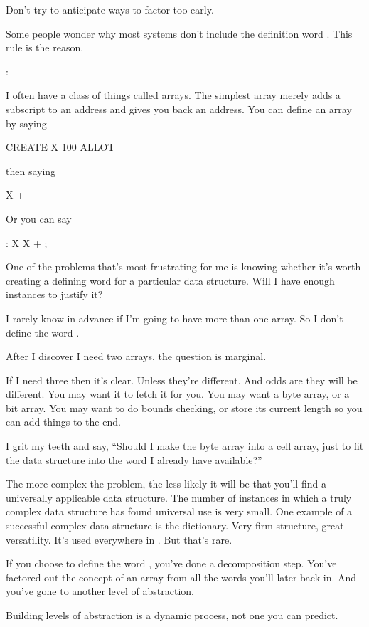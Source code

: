 \begin{tip}
Don't try to anticipate ways to factor too early.
\end{tip}%
Some people wonder why most \Forth{} systems don't include the
definition word . This rule is the reason.
\begin{interview}
:
\begin{tfquot}
I often have a class of things called arrays. The simplest array
merely adds a subscript to an address and gives you back an
address. You can define an array by saying
\begin{Code}
CREATE X   100 ALLOT
\end{Code}
then saying
\begin{Code}
X +
\end{Code}
Or you can say
\begin{Code}
: X   X + ;
\end{Code}
One of the problems that's most frustrating for me is knowing whether
it's worth creating a defining word for a particular data structure.
Will I have enough instances to justify it?

I rarely know in advance if I'm going to have more than one array. So
I don't define the word .

After I discover I need two arrays, the question is marginal.

If I need three then it's clear. Unless they're different. And odds
are they will be different. You may want it to fetch it for you. You
may want a byte array, or a bit array. You may want to do bounds
checking, or store its current length so you can add things to the
end.

I grit my teeth and say, ``Should I make the byte array into a cell
array, just to fit the data structure into the word I already have
available?''

The more complex the problem, the less likely it will be that you'll
find a universally applicable data structure. The number of instances
in which a truly complex data structure has found universal use is
very small. One example of a successful complex data structure is the
\Forth{} dictionary. Very firm structure, great versatility. It's used
everywhere in \Forth{}. But that's rare.

If you choose to define the word , you've done a
decomposition step. You've factored out the concept of an array from
all the words you'll later back in. And you've gone to another level
of abstraction.

Building levels of abstraction is a dynamic process, not one you can
predict.
\end{tfquot}
\end{interview}%
